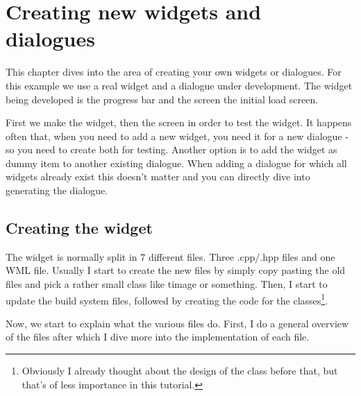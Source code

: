 \chapter{Creating new widgets and dialogues}

This chapter dives into the area of creating your own widgets or dialogues. For
this example we use a real widget and a dialogue under development. The widget
being developed is the progress bar and the screen the initial load screen.

First we make the widget, then the screen in order to test the widget. It
happens often that, when you need to add a new widget, you need it for a new
dialogue - so you need to create both for testing. Another option is to add the
widget as dummy item to another existing dialogue. When adding a dialogue for
which all widgets already exist this doesn't matter and you can directly dive
into generating the dialogue.

\section{Creating the widget}
\label{sec:creating_the_widget}

The widget is normally split in 7 different files. Three .cpp/.hpp files and one
WML file. Usually I start to create the new files by simply copy pasting the old
files and pick a rather small class like timage or something. Then, I start to
update the build system files, followed by creating the code for the
classes\footnote{Obviously I already thought about the design of the class
before that, but that's of less importance in this tutorial.}.

Now, we start to explain what the various files do. First, I do a general overview of
the files after which I dive more into the implementation of each file.

